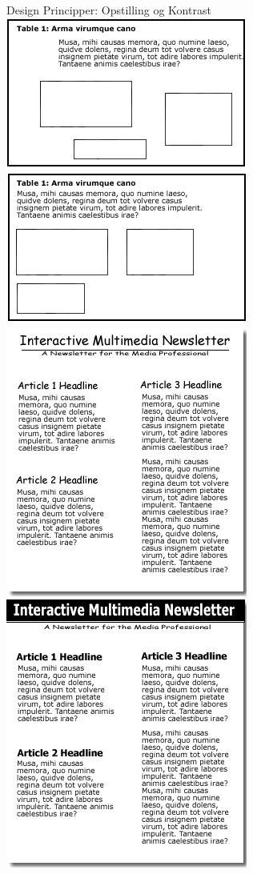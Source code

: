 \documentclass[10pt]{beamer}
\begin{document}
\begin{frame}{Design Principper: Opstilling og Kontrast}
\centering
	\includegraphics[width=.45\linewidth]{img/noalignmentexample.png}\quad%
	\includegraphics[width=.45\linewidth]{img/alignmentexample.png}\quad%
	\includegraphics[width=.45\linewidth]{img/nocontrastexample.png}\quad%
	\includegraphics[width=.45\linewidth]{img/contrastexample.png}
\end{frame}
\end{document}

